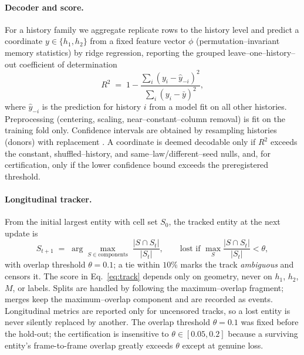 \documentclass[11pt]{article}
\begin{document}
\paragraph{Decoder and score.} For a history family we aggregate replicate rows to the history level and predict a
coordinate $y\in\{h_1,h_2\}$ from a fixed feature vector $\phi$ (permutation--invariant memory statistics) by ridge
regression, reporting the grouped leave--one--history--out coefficient of determination
\begin{equation}
R^2 \;=\; 1 - \frac{\sum_i (y_i-\hat y_{-i})^2}{\sum_i (y_i-\bar y)^2},
\label{eq:r2}
\end{equation}
where $\hat y_{-i}$ is the prediction for history $i$ from a model fit on all other histories. Preprocessing
(centering, scaling, near--constant--column removal) is fit on the training fold only. Confidence intervals are
obtained by resampling histories (donors) with replacement \citep{efron1979}. A coordinate is deemed decodable only
if $R^2$ exceeds the constant, shuffled--history, and same--law/different--seed nulls, and, for certification, only
if the lower confidence bound exceeds the preregistered threshold.

\paragraph{Longitudinal tracker.} From the initial largest entity with cell set $S_0$, the tracked entity at the
next update is
\begin{equation}
S_{t+1} \;=\; \arg\max_{S\in \text{components}} \; \frac{|S \cap S_t|}{|S_t|},
\qquad \text{lost if } \max_S \frac{|S\cap S_t|}{|S_t|} < \theta,
\label{eq:track}
\end{equation}
with overlap threshold $\theta=0.1$; a tie within $10\%$ marks the track \emph{ambiguous} and censors it. The score
in Eq.~\eqref{eq:track} depends only on geometry, never on $h_1$, $h_2$, $M$, or labels. Splits are handled by
following the maximum--overlap fragment; merges keep the maximum--overlap component and are recorded as events.
Longitudinal metrics are reported only for uncensored tracks, so a lost entity is never silently replaced by another. The overlap threshold $\theta=0.1$ was fixed before the hold-out; the certification is insensitive to $\theta\in[0.05,0.2]$ because a surviving entity's frame-to-frame overlap greatly exceeds $\theta$ except at genuine loss.
\end{document}
